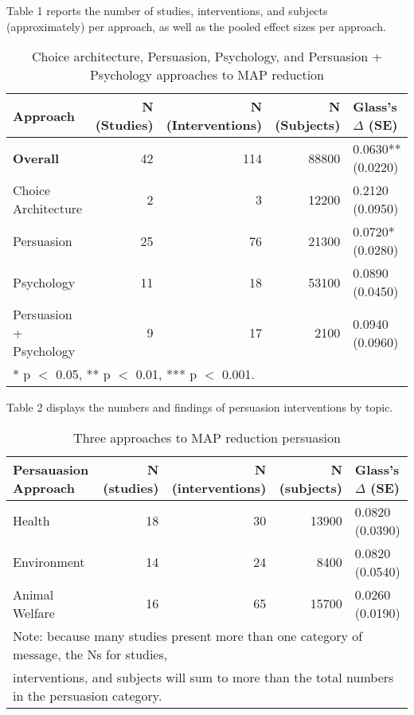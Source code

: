 \documentclass[sn-nature,referee,pdflatex]{sn-jnl}
\begin{document}
Table 1 reports the number of studies, interventions, and subjects
(approximately) per approach, as well as the pooled effect sizes per
approach.

\begin{table}[!h]
\centering
\caption{\label{tab:table_one}Choice architecture, Persuasion, Psychology, and Persuasion + Psychology approaches to MAP reduction}
\centering
\begin{tabular}[t]{lrrrl}
\toprule
Approach & N (Studies) & N (Interventions) & N (Subjects) & Glass's $\Delta$ (SE)\\
\midrule
\textbf{Overall} & 42 & 114 & 88800 & 0.0630** (0.0220)\\
Choice Architecture & 2 & 3 & 12200 & 0.2120 (0.0950)\\
Persuasion & 25 & 76 & 21300 & 0.0720* (0.0280)\\
Psychology & 11 & 18 & 53100 & 0.0890 (0.0450)\\
Persuasion + Psychology & 9 & 17 & 2100 & 0.0940 (0.0960)\\
\bottomrule
\multicolumn{5}{l}{\rule{0pt}{1em}* p $<$ 0.05, ** p $<$ 0.01, *** p $<$ 0.001.}\\
\end{tabular}
\end{table}

Table 2 displays the numbers and findings of persuasion interventions by
topic.

\begin{table}[!h]
\centering
\caption{\label{tab:table_two}Three approaches to MAP reduction persuasion}
\centering
\begin{tabular}[t]{lrrrl}
\toprule
Persauasion Approach & N (studies) & N (interventions) & N (subjects) & Glass's $\Delta$ (SE)\\
\midrule
Health & 18 & 30 & 13900 & 0.0820 (0.0390)\\
Environment & 14 & 24 & 8400 & 0.0820 (0.0540)\\
Animal Welfare & 16 & 65 & 15700 & 0.0260 (0.0190)\\
\bottomrule
\multicolumn{5}{l}{\textsuperscript{} Note: because many studies present more than one category of message, the Ns for studies, \linebreak}\\
\multicolumn{5}{l}{interventions, and subjects will sum to more than the total numbers in the persuasion category.}\\
\end{tabular}
\end{table}
\end{document}
